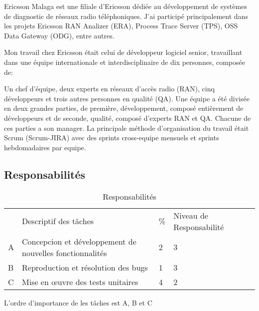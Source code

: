 \documentclass{resume} %
\begin{document}
Ericsson Malaga est une filiale d'Ericsson dédiée au développement de systèmes de diagnostic de réseaux radio téléphoniques.
J'ai participé principalement dans les projets Ericsson RAN \footnotemark Analizer  (ERA), Process Trace Server (TPS), OSS Data Gateway (ODG), entre autres. 


Mon travail chez Ericsson était celui de développeur logiciel senior, travaillant dans une équipe internationale et interdisciplinaire de dix personnes, composée de:

Un chef d'équipe, deux experts en réseaux d'accès radio (RAN), cinq développeurs et trois autres personnes en qualité (QA).
Une équipe a été divisée en deux grandes parties, de première, développement, composé entièrement de développeurs et de seconde, qualité, composé d'experts RAN et QA. Chacune de ces parties a son manager.
La principale méthode d'organisation du travail était Scrum (Scrum-JIRA) avec des sprints cross-equipe mensuels et sprints hebdomadaires par equipe. 


\subsection{Responsabilités}
	
	
\begin{table}[!htbp]
\label{my-label}
\begin{tabular}{|l|l|l|l|l}
\cline{1-4}
   & Descriptif des tâches &  \% & Niveau de Responsabilité \footnotemark  &  \\ \cline{1-4}  
A & Concepcion et développement de nouvelles fonctionnalités & 2 & 3 & \\ \cline {1-4}
B & Reproduction et résolution des bugs & 1 & 3 & \\ \cline {1-4}
C & Mise en œuvre des tests unitaires & 4 & 2 & \\ \cline {1-4}
\end{tabular}
\caption{Responsabilités}
\end{table}

L'ordre d'importance de les tâches est A, B et C


\end{document}
